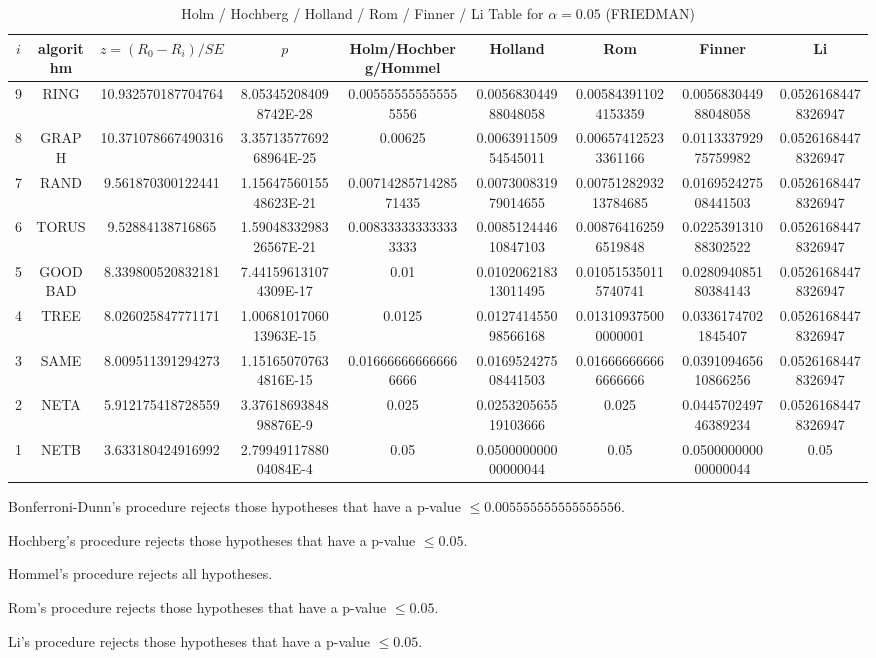 \documentclass[a4paper,10pt]{article}
\begin{document}
\begin{landscape}
\begin{table}[!htp]
\centering\scriptsize
\caption{Holm / Hochberg / Holland / Rom / Finner / Li Table for $\alpha=0.05$ (FRIEDMAN)}
\begin{tabular}{ccccccccc}
$i$&algorithm&$z=(R_0 - R_i)/SE$&$p$&Holm/Hochberg/Hommel&Holland&Rom&Finner&Li\\
\hline
9& RING&10.932570187704764&8.053452084098742E-28&0.005555555555555556&0.005683044988048058&0.005843911024153359&0.005683044988048058&0.05261684478326947\\
8& GRAPH&10.371078667490316&3.3571357769268964E-25&0.00625&0.006391150954545011&0.006574125233361166&0.011333792975759982&0.05261684478326947\\
7& RAND&9.561870300122441&1.1564756015548623E-21&0.0071428571428571435&0.007300831979014655&0.0075128293213784685&0.016952427508441503&0.05261684478326947\\
6& TORUS&9.52884138716865&1.5904833298326567E-21&0.008333333333333333&0.008512444610847103&0.008764162596519848&0.022539131088302522&0.05261684478326947\\
5& GOODBAD&8.339800520832181&7.441596131074309E-17&0.01&0.010206218313011495&0.010515350115740741&0.028094085180384143&0.05261684478326947\\
4& TREE&8.026025847771171&1.0068101706013963E-15&0.0125&0.012741455098566168&0.013109375000000001&0.03361747021845407&0.05261684478326947\\
3& SAME&8.009511391294273&1.151650707634816E-15&0.016666666666666666&0.016952427508441503&0.016666666666666666&0.039109465610866256&0.05261684478326947\\
2& NETA&5.912175418728559&3.3761869384898876E-9&0.025&0.025320565519103666&0.025&0.044570249746389234&0.05261684478326947\\
1& NETB&3.633180424916992&2.7994911788004084E-4&0.05&0.050000000000000044&0.05&0.050000000000000044&0.05\\
\hline
\end{tabular}
\end{table}
Bonferroni-Dunn's procedure rejects those hypotheses that have a p-value $\le0.005555555555555556$.


Hochberg's procedure rejects those hypotheses that have a p-value $\le0.05$.


Hommel's procedure rejects all hypotheses.


Rom's procedure rejects those hypotheses that have a p-value $\le0.05$.


Li's procedure rejects those hypotheses that have a p-value $\le0.05$.




\end{landscape}
\end{document}
